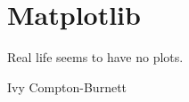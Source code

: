 \chapter{Matplotlib}
\label{chp:Matplotlib}
\epigraph{
	Real life seems to have no plots.
}{Ivy Compton-Burnett}